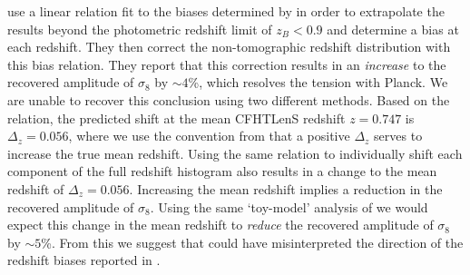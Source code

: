 \cite{kitching/etal:2016} use a linear relation fit to the biases determined by \citet{choi/etal:2016} in order to extrapolate the results beyond the photometric redshift limit of $z_B<0.9$ and determine a bias at each redshift.  They then correct the non-tomographic \citet{kilbinger/etal:2013} redshift distribution with this bias relation.  They report that this correction results in an {\it increase} to the recovered amplitude of $\sigma_8$ by $\sim 4$\%, which resolves the tension with Planck.   We are unable to recover this conclusion using two different methods.   Based on the \cite{kitching/etal:2016} relation, the predicted shift at the mean CFHTLenS redshift $z=0.747$ is $\Delta_z = 0.056$, where we use the convention from \citet{choi/etal:2016} that a positive $\Delta_z$ serves to increase the true mean redshift.  Using the same relation to individually shift each component of the full \citet{kilbinger/etal:2013} redshift histogram also results in a change to the mean redshift of $\Delta_z = 0.056$.  Increasing the mean redshift implies a reduction in the recovered amplitude of $\sigma_8$.  Using the same `toy-model' analysis of \citet{choi/etal:2016} we would expect this change in the mean redshift to {\it reduce} the recovered amplitude of $\sigma_8$ by $\sim 5$\%.    From this we suggest that \cite{kitching/etal:2016} could have misinterpreted the direction of the redshift biases reported in \citet{choi/etal:2016}. 



 